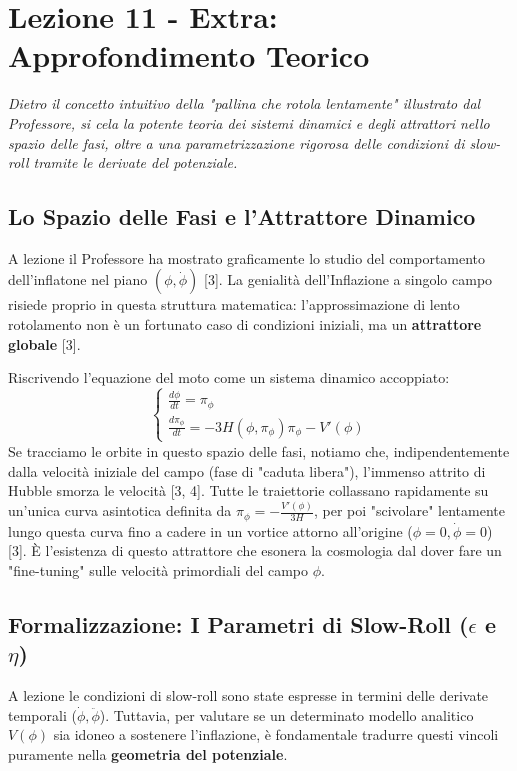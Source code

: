 \documentclass[11pt,a4paper]{report}
\begin{document}
\newpage
\section{Lezione 11 - Extra: Approfondimento Teorico}

\textit{Dietro il concetto intuitivo della "pallina che rotola lentamente" illustrato dal Professore, si cela la potente teoria dei sistemi dinamici e degli attrattori nello spazio delle fasi, oltre a una parametrizzazione rigorosa delle condizioni di slow-roll tramite le derivate del potenziale.}

\subsection{Lo Spazio delle Fasi e l'Attrattore Dinamico}
A lezione il Professore ha mostrato graficamente lo studio del comportamento dell'inflatone nel piano $(\phi, \dot{\phi})$ [3]. La genialità dell'Inflazione a singolo campo risiede proprio in questa struttura matematica: l'approssimazione di lento rotolamento non è un fortunato caso di condizioni iniziali, ma un \textbf{attrattore globale} [3].

Riscrivendo l'equazione del moto come un sistema dinamico accoppiato:
\begin{equation}
\begin{cases}
\frac{d\phi}{dt} = \pi_\phi \\
\frac{d\pi_\phi}{dt} = -3H(\phi, \pi_\phi) \pi_\phi - V'(\phi)
\end{cases}
\end{equation}
Se tracciamo le orbite in questo spazio delle fasi, notiamo che, indipendentemente dalla velocità iniziale del campo (fase di "caduta libera"), l'immenso attrito di Hubble smorza le velocità [3, 4]. Tutte le traiettorie collassano rapidamente su un'unica curva asintotica definita da $\pi_\phi = -\frac{V'(\phi)}{3H}$, per poi "scivolare" lentamente lungo questa curva fino a cadere in un vortice attorno all'origine ($\phi=0, \dot{\phi}=0$) [3]. È l'esistenza di questo attrattore che esonera la cosmologia dal dover fare un "fine-tuning" sulle velocità primordiali del campo $\phi$.

\subsection{Formalizzazione: I Parametri di Slow-Roll ($\epsilon$ e $\eta$)}
A lezione le condizioni di slow-roll sono state espresse in termini delle derivate temporali ($\dot{\phi}, \ddot{\phi}$). Tuttavia, per valutare se un determinato modello analitico $V(\phi)$ sia idoneo a sostenere l'inflazione, è fondamentale tradurre questi vincoli puramente nella \textbf{geometria del potenziale}.
\end{document}
